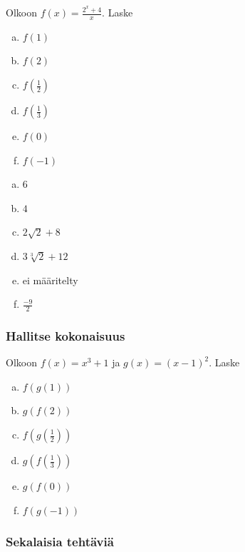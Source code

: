 \begin{tehtava}
Olkoon $f(x)=\frac{2^x+4}{x}$. Laske
\begin{enumerate}[a)]
\item $f(1)$
\item $f(2)$
\item $f(\frac{1}{2})$
\item $f(\frac{1}{3})$
\item $f(0)$
\item $f(-1)$
\end{enumerate}
\begin{vastaus}
\begin{enumerate}[a)]
\item $6$
\item $4$
\item $2\sqrt{2}+8$
\item $3\sqrt[3]{2}+12$
\item ei määritelty
\item $\frac{-9}{2}$
\end{enumerate}
\end{vastaus}
\end{tehtava}


\subsubsection*{Hallitse kokonaisuus}

\begin{tehtava}
Olkoon $f(x)=x^3+1$ ja $g(x)=(x-1)^2$. Laske
\begin{enumerate}[a)]
\item $f(g(1))$
\item $g(f(2))$
\item $f(g(\frac{1}{2}))$
\item $g(f(\frac{1}{3}))$
\item $g(f(0))$
\item $f(g(-1))$
\end{enumerate}
\end{tehtava}

\subsubsection*{Sekalaisia tehtäviä}


